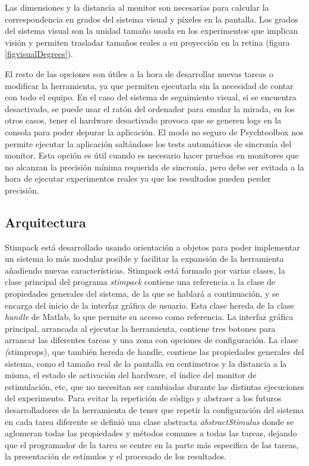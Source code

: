 \documentclass[conference]{IEEEtran}
\begin{document}
Las dimensiones y la distancia al monitor son necesarias para calcular la correspondencia en grados del sistema visual y píxeles en la pantalla. Los grados del sistema visual son la unidad tamaño usada en los experimentos que implican visión y permiten trasladar tamaños reales a su proyección en la retina (figura \ref{figvisualDegrees}).

El resto de las opciones son útiles a la hora de desarrollar nuevas tareas o modificar la herramienta, ya que permiten ejecutarla sin la necesidad de contar con todo el equipo. En el caso del sistema de seguimiento visual, si se encuentra desactivado, se puede usar el ratón del ordenador para emular la mirada, en los otros casos, tener el hardware desactivado provoca que se generen logs en la consola para poder depurar la aplicación.
El modo no seguro de Psychtoolbox nos permite ejecutar la aplicación saltándose los tests automáticos de sincronía del monitor. Esta opción es útil cuando es necesario hacer pruebas en monitores que no alcanzan la precisión mínima requerida de sincronía, pero debe ser evitada a la hora de ejecutar experimentos reales ya que los resultados pueden perder precisión.

\subsection{Arquitectura}
Stimpack está desarrollado usando orientación a objetos para poder implementar un sistema lo más modular posible y facilitar la expansión de la herramienta añadiendo nuevas características.
Stimpack está formado por varias clases, la clase principal del programa \textit{stimpack} contiene una referencia a la clase de propiedades generales del sistema, de la que se hablará a continuación, y se encarga del inicio de la interfaz gráfica de usuario. Esta clase hereda de la clase \textit{handle} de Matlab, lo que permite su acceso como referencia. La interfaz gráfica principal, arrancada al ejecutar la herramienta, contiene tres botones para arrancar las diferentes tareas y una zona con opciones de configuración.
La clase \textit(stimprops), que también hereda de handle, contiene las propiedades generales del sistema, como el tamaño real de la pantalla en centímetros y la distancia a la misma, el estado de activación del hardware, el índice del monitor de estimulación, etc, que no necesitan ser cambiadas durante las distintas ejecuciones del experimento.
Para evitar la repetición de código y abstraer a los futuros desarrolladores de la herramienta de tener que repetir la configuración del sistema en cada tarea diferente se definió una clase abstracta \textit{abstractStimulus} donde se aglomeran todas las propiedades y métodos comunes a todas las tareas, dejando que el  programador de la tarea se centre en la parte más especifica de las tareas, la presentación de estímulos y el procesado de los resultados.
\end{document}
